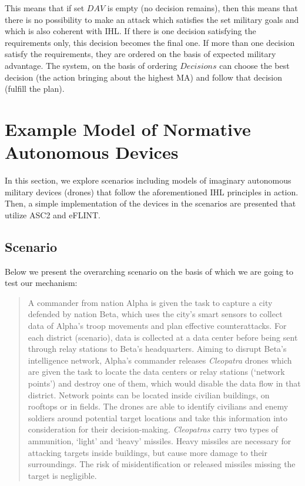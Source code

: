 This means that if set $DAV$ is empty (no decision remains), then this means that there is no possibility to make an attack which satisfies the set military goals and which is also coherent with IHL. If there is one decision satisfying the requirements only, this decision becomes the final one. If more than one decision satisfy the requirements, they are ordered on the basis of expected military advantage. 
The system, on the basis of ordering $Decisions$ can choose the best decision (the action bringing about the highest MA) and follow that decision (fulfill the plan). 



\section{Example Model of Normative Autonomous Devices}
In this section, we explore scenarios including models of imaginary autonomous military devices (drones) that follow the aforementioned IHL principles in action. Then, a simple implementation of the devices in the scenarios are presented that utilize ASC2 and eFLINT.

\subsection{Scenario}
\label{sec:Scenario}
Below we present the overarching scenario on the basis of which we are going to test our mechanism:

\begin{quote}
    A commander from nation Alpha is given the task to capture a city defended by nation Beta, which uses the city’s smart sensors to collect data of Alpha’s troop movements and plan effective counterattacks. For each district (scenario), data is collected at a data center before being sent through relay stations to Beta’s headquarters. Aiming to disrupt Beta’s intelligence network, Alpha’s commander releases \textit{Cleopatra} drones which are given the task to locate the data centers or relay stations (‘network points’) and destroy one of them, which would disable the data flow in that district. Network points can be located inside civilian buildings, on rooftops or in fields. The drones are able to identify civilians and enemy soldiers around potential target locations and take this information into consideration for their decision-making. \textit{Cleopatras} carry two types of ammunition, ‘light’ and ‘heavy’ missiles. Heavy missiles are necessary for attacking targets inside buildings, but cause more damage to their surroundings. The risk of misidentification or released missiles missing the target is negligible. %
\end{quote}

